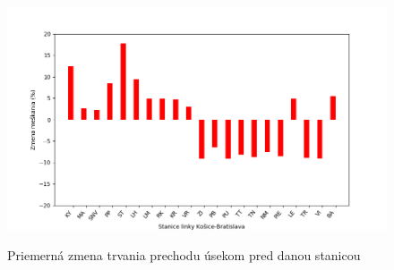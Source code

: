 \documentclass[11pt,a4paper]{article}
\begin{document}
\begin{figure}[H]
    \begin{center}
    \scalebox{0.75}
    {
        \includegraphics{Figure_2.png}
    }
    \caption{Priemerná zmena trvania prechodu úsekom pred danou stanicou}
    \label{pic:GRAF2}
    \end{center}
\end{figure}

\newpage
\renewcommand\refname{Odkazy}

\end{document}
